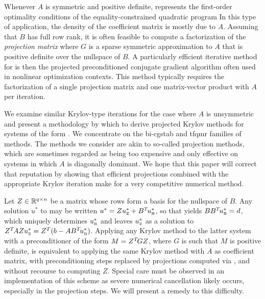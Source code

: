 \documentclass{report}
\begin{document}
Whenever $A$ is symmetric and positive definite,
 represents the first-order optimality conditions of the
equality-constrained quadratic program
In this type of application, the density of the coefficient matrix is mostly
due to $A$. Assuming that $B$ has full row rank, it is often feasible to
compute a factorization of the {\em projection matrix}
where $G$ is a sparse symmetric approximation to $A$ that is positive definite
over the nullspace of $B$. A particularly efficient iterative method for
 is then the projected preconditioned conjugate gradient algorithm
often used in
nonlinear optimization contexts. This method typically requires the
factorization of a single projection matrix and one matrix-vector product with
$A$ per iteration.

We examine similar Krylov-type iterations for the case where $A$
is unsymmetric and present a methodology by which to derive projected Krylov
methods for systems of the form . We concentrate on the {\sc
b}i-{\sc cgstab} and {\sc tfqmr} families of methods. The methods we consider
are akin to so-called projection methods,
which are
sometimes regarded as being too expensive and only effective on systems in
which $A$ is diagonally dominant. We hope that this
paper will correct that reputation by showing that efficient projections
combined with the appropriate Krylov iteration make for a very competitive
numerical method.

Let $Z \in {\mathbb R}^{q \times n}$ be a matrix whose rows form a basis for the
nullspace of $B$. Any solution $u^*$ to  may be written $u^*
= Z u^*_{{\mbox {\tiny Z}}} + B^T\! u^*_{{\mbox {\tiny B}}}$, so that  yields $B B^T\!
u^*_{{\mbox {\tiny B}}} = d$, which uniquely determines $u^*_{{\mbox {\tiny B}}}$ and leaves $u^*_{{\mbox {\tiny Z}}}$
as a solution to $Z^T\! A Z u^*_{{\mbox {\tiny Z}}} = Z^T (b - A B^T\! u^*_{{\mbox {\tiny B}}})$. Applying
any Krylov method to the latter system with a preconditioner of the form $M =
Z^T\! G Z$, where $G$ is such that $M$ is positive definite, is equivalent to
applying the same Krylov method with $A$ as coefficient matrix, with
preconditioning steps replaced by projections computed via ,
and without recourse to computing $Z$. Special care must be observed in an
implementation of this scheme as severe numerical cancellation likely occurs,
especially in the projection steps. We will present a remedy to this difficulty.
\end{document}
